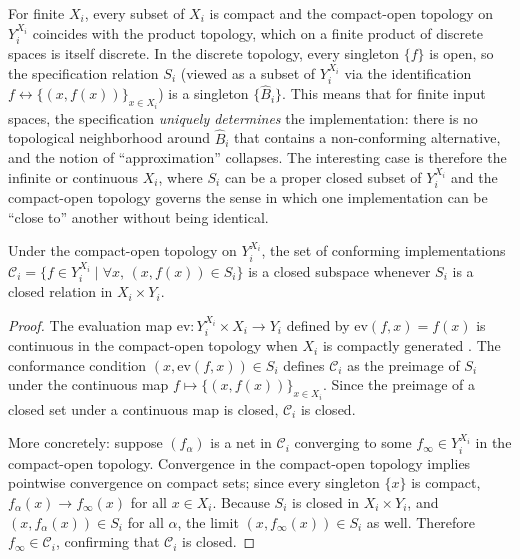 \begin{remark}
For finite $X_i$, every subset of $X_i$ is compact and the compact-open topology
on $Y_i^{X_i}$ coincides with the product topology, which on a finite product of
discrete spaces is itself discrete.  In the discrete topology, every singleton
$\{f\}$ is open, so the specification relation $S_i$ (viewed as a subset of
$Y_i^{X_i}$ via the identification $f \leftrightarrow \{(x, f(x))\}_{x \in X_i}$)
is a singleton $\{ \hat{B}_i \}$.  This means that for finite input spaces, the
specification \emph{uniquely determines} the implementation: there is no
topological neighborhood around $\hat{B}_i$ that contains a non-conforming
alternative, and the notion of ``approximation'' collapses.  The interesting case
is therefore the infinite or continuous $X_i$, where $S_i$ can be a proper closed
subset of $Y_i^{X_i}$ and the compact-open topology governs the sense in which
one implementation can be ``close to'' another without being identical.
\end{remark}

\begin{proposition}
\label{prop:spec-closed}
Under the compact-open topology on $Y_i^{X_i}$, the set of conforming
implementations $\mathcal{C}_i = \{ f \in Y_i^{X_i} \mid \forall x,\, (x,f(x)) \in
S_i \}$ is a closed subspace whenever $S_i$ is a closed relation in $X_i \times
Y_i$.
\end{proposition}

\begin{proof}
The evaluation map $\mathrm{ev} : Y_i^{X_i} \times X_i \to Y_i$ defined by
$\mathrm{ev}(f, x) = f(x)$ is continuous in the compact-open topology when $X_i$
is compactly generated \cite{maclane1971}.  The conformance condition
$(x, \mathrm{ev}(f,x)) \in S_i$ defines $\mathcal{C}_i$ as the preimage of $S_i$
under the continuous map $f \mapsto \{(x, f(x))\}_{x \in X_i}$.  Since the
preimage of a closed set under a continuous map is closed, $\mathcal{C}_i$ is
closed.

More concretely: suppose $(f_\alpha)$ is a net in $\mathcal{C}_i$ converging to
some $f_\infty \in Y_i^{X_i}$ in the compact-open topology.  Convergence in the
compact-open topology implies pointwise convergence on compact sets; since every
singleton $\{x\}$ is compact, $f_\alpha(x) \to f_\infty(x)$ for all $x \in X_i$.
Because $S_i$ is closed in $X_i \times Y_i$, and $(x, f_\alpha(x)) \in S_i$ for
all $\alpha$, the limit $(x, f_\infty(x)) \in S_i$ as well.  Therefore $f_\infty
\in \mathcal{C}_i$, confirming that $\mathcal{C}_i$ is closed.
\end{proof}

